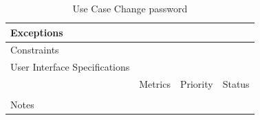 \begin{table}[H]
\begin{tabularx}{\linewidth}{|l|X|X|X|}
            \hline Exceptions                    & \multicolumn{3}{l|}{}                                                                                 \\

            \hline Constraints                   & \multicolumn{3}{l|}{}                                                                                 \\

            \hline User Interface Specifications & \multicolumn{3}{l|}{}                                                                                 \\

            \hline \multirow{2}{*}{}             & Metrics                                                                           & Priority & Status \\
            \cline{2-4}                          &                                                                                   &          &        \\
            \hline Notes                         & \multicolumn{3}{l|}{}                                                                                 \\
            \hline
      \end{tabularx}
      \caption{Use Case Change password}
      \label{tab:use_case_change_password}
\end{table}

